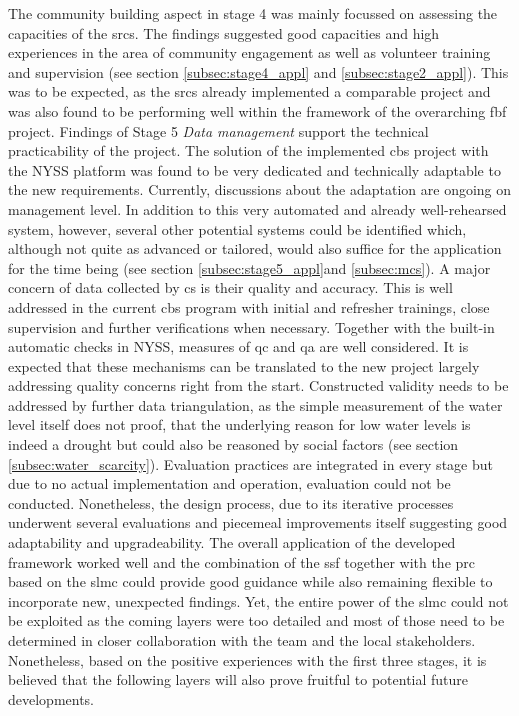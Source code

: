 The community building aspect in stage 4 was mainly focussed on assessing the capacities of the \acrshort{srcs}. The findings suggested good capacities and high experiences in the area of community engagement as well as volunteer training and supervision (see section \ref{subsec:stage4_appl} and \ref{subsec:stage2_appl}). This was to be expected, as the \acrshort{srcs} already implemented a comparable project and was also found to be performing well within the framework of the overarching \acrshort{fbf} project. Findings of Stage 5 \textit{Data management} support the technical practicability of the project. The solution of the implemented \acrshort{cbs} project with the NYSS platform was found to be very dedicated and technically adaptable to the new requirements. Currently, discussions about the adaptation are ongoing on management level. In addition to this very automated and already well-rehearsed system, however, several other potential systems could be identified which, although not quite as advanced or tailored, would also suffice for the application for the time being (see section \ref{subsec:stage5_appl}and \ref{subsec:mcs}).\newline
A major concern of data collected by \acrshort{cs} is their quality and accuracy. This is well addressed in the current \acrshort{cbs} program with initial and refresher trainings, close supervision and further verifications when necessary. Together with the built-in automatic checks in NYSS, measures of \acrshort{qc} and \acrshort{qa} are well considered. It is expected that these mechanisms can be translated to the new project largely addressing quality concerns right from the start. Constructed validity needs to be addressed by further data triangulation, as the simple measurement of the water level itself does not proof, that the underlying reason for low water levels is indeed a drought but could also be reasoned by social factors (see section \ref{subsec:water_scarcity}). Evaluation practices are integrated in every stage but due to no actual implementation and operation, evaluation could not be conducted. Nonetheless, the design process, due to its iterative processes underwent several evaluations and piecemeal improvements itself suggesting good adaptability and upgradeability.\newline
The overall application of the developed framework worked well and the combination of the \acrshort{ssf} together with the \acrshort{prc} based on the \acrshort{slmc} could provide good guidance while also remaining flexible to incorporate new, unexpected findings. Yet, the entire power of the \acrshort{slmc} could not be exploited as the coming layers were too detailed and most of those need to be determined in closer collaboration with the team and the local stakeholders. Nonetheless, based on the positive experiences with the first three stages, it is believed that the following layers will also prove fruitful to potential future developments.\newline
